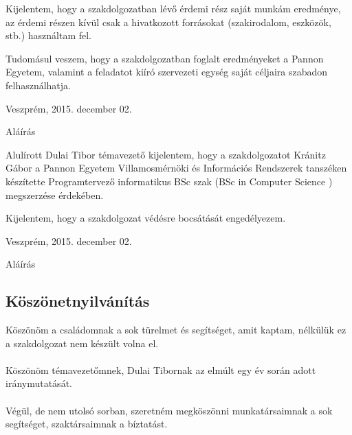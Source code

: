 \documentclass[a4paper,12pt,oneside]{report}
\begin{document}
Kijelentem, hogy a szakdolgozatban lévő érdemi rész saját munkám eredménye, az érdemi részen kívül csak a hivatkozott forrásokat (szakirodalom, eszközök, stb.) használtam fel.

Tudomásul veszem, hogy a szakdolgozatban foglalt eredményeket a Pannon Egyetem, valamint a feladatot kiíró szervezeti egység saját céljaira szabadon felhasználhatja.\\

\begin{flushleft}
{Veszprém, 2015. december 02.\\}
\end{flushleft}

\begin{flushright}
{Aláírás \vspace{4cm}}
\end{flushright}

Alulírott Dulai Tibor témavezető kijelentem, hogy a szakdolgozatot Kránitz Gábor a Pannon Egyetem Villamosmérnöki és Információs Rendszerek tanszéken készítette Programtervező informatikus BSc szak (BSc in Computer Science
) megszerzése érdekében.

Kijelentem, hogy a szakdolgozat védésre bocsátását engedélyezem.\\

\begin{flushleft}
{Veszprém, 2015. december 02.\\}
\end{flushleft}

\begin{flushright}
{Aláírás}
\end{flushright}
\newpage
\pagebreak
\begin{center}
\section*{Köszönetnyilvánítás}
\end{center}

Köszönöm a családomnak a sok türelmet és segítséget, amit kaptam, nélkülük ez a szakdolgozat nem készült volna el.
\\
\\
Köszönöm témavezetőmnek, Dulai Tibornak az elmúlt egy év során adott iránymutatását.
\\
\\
Végül, de nem utolsó sorban, szeretném megköszönni munkatársaimnak a sok segítséget, szaktársaimnak a bíztatást.
\end{document}
